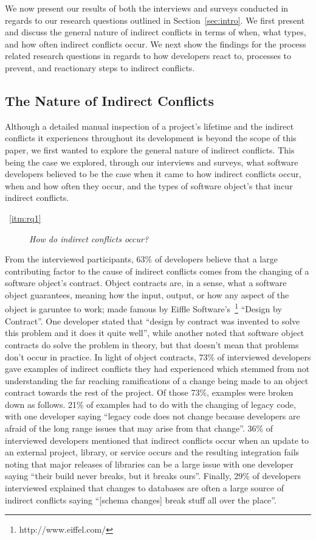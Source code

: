 \documentclass[conference]{IEEEtran}
\begin{document}
We now present our results of both the interviews and surveys conducted in regards to our research questions
outlined in Section~\ref{sec:intro}. We first present and discuss the general nature of indirect conflicts in
terms of when, what types, and how often indirect conflicts occur. We next show the findings for the process
related research questions in regards to how developers react to, processes to prevent, and reactionary steps
to indirect conflicts.

\subsection{The Nature of Indirect Conflicts}

Although a detailed manual inspection of a project's lifetime and the indirect conflicts it experiences throughout
its development is beyond the scope of this paper, we first wanted to explore the general nature of indirect 
conflicts. This being the case we explored, through our interviews and surveys, what software developers believed
to be the case when it came to how indirect conflicts occur, when and how often they occur, and the types of 
software object's that incur indirect conflicts.

\begin{description}
	\item[~\ref{itm:rq1}] \textit{How do indirect conflicts occur?}
\end{description}

From the interviewed participants, 63\% of developers believe that a large contributing factor to the cause
of indirect conflicts comes from the changing of a software object's contract. Object contracts are, in a sense,
what a software object guarantees, meaning how the input, output, or how any aspect of the object is garuntee
to work; made famous by Eiffle Software's~\footnote{http://www.eiffel.com/} ``Design by Contract''\textregistered. 
One developer stated that ``design
by contract was invented to solve this problem and it does it quite well'', while another noted that software 
object contracts do solve the problem in theory, but that doesn't mean that problems don't occur in practice.
In light of object contracts, 73\% of interviewed developers gave examples of indirect conflicts they had experienced
which stemmed from not understanding the far reaching ramifications of a change being made to an object contract
towards the rest of the project. Of those 73\%, examples were broken down as follows. 21\% of examples had to do 
with the changing of legacy code, with one developer saying ``legacy code does not change because developers 
are afraid of the long range issues that may arise from that change''. 36\% of interviewed developers mentioned 
that indirect conflicts occur when an update to an external project, library, or service occurs and the resulting 
integration fails noting that major releases of libraries can be a large issue with one developer saying 
``their build never breaks, but it breaks ours''. Finally, 29\% of developers interviewed explained that changes to
databases are often a large source of indirect conflicts saying ``[schema changes] break stuff all over the place''.
\end{document}
